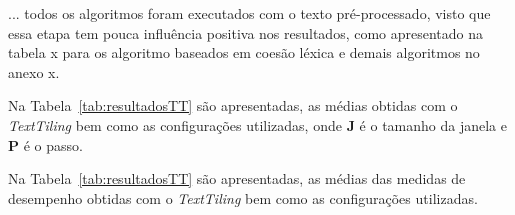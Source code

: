 ... todos os algoritmos foram executados com o texto pré-processado, visto que essa etapa tem pouca influência positiva nos resultados, 
como apresentado na tabela x para os algoritmo baseados em coesão léxica e demais algoritmos no anexo x.





















































  Na Tabela~\ref{tab:resultadosTT} são apresentadas, as médias obtidas com o \textit{TextTiling} bem como as configurações utilizadas, onde \textbf{J} é o tamanho da janela e \textbf{P} é o passo.



Na Tabela~\ref{tab:resultadosTT} são apresentadas, as médias das medidas de desempenho obtidas com o \textit{TextTiling} bem como as configurações utilizadas.

















































